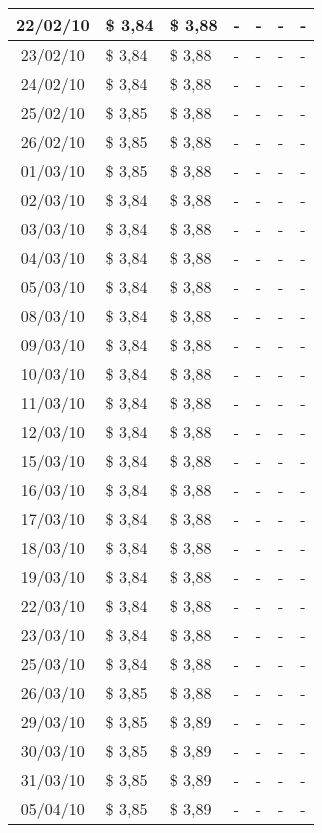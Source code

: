 \begin{center}
\begin{longtable}{|c|p{1.5cm}|p{1.5cm}|p{1.5cm}|p{1.5cm}|p{1.5cm}|p{1.5cm}|}
22/02/10 & \$ 3,84 & \$ 3,88 & - & - & - & - \\ \hline
23/02/10 & \$ 3,84 & \$ 3,88 & - & - & - & - \\ \hline
24/02/10 & \$ 3,84 & \$ 3,88 & - & - & - & - \\ \hline
25/02/10 & \$ 3,85 & \$ 3,88 & - & - & - & - \\ \hline
26/02/10 & \$ 3,85 & \$ 3,88 & - & - & - & - \\ \hline
01/03/10 & \$ 3,85 & \$ 3,88 & - & - & - & - \\ \hline
02/03/10 & \$ 3,84 & \$ 3,88 & - & - & - & - \\ \hline
03/03/10 & \$ 3,84 & \$ 3,88 & - & - & - & - \\ \hline
04/03/10 & \$ 3,84 & \$ 3,88 & - & - & - & - \\ \hline
05/03/10 & \$ 3,84 & \$ 3,88 & - & - & - & - \\ \hline
08/03/10 & \$ 3,84 & \$ 3,88 & - & - & - & - \\ \hline
09/03/10 & \$ 3,84 & \$ 3,88 & - & - & - & - \\ \hline
10/03/10 & \$ 3,84 & \$ 3,88 & - & - & - & - \\ \hline
11/03/10 & \$ 3,84 & \$ 3,88 & - & - & - & - \\ \hline
12/03/10 & \$ 3,84 & \$ 3,88 & - & - & - & - \\ \hline
15/03/10 & \$ 3,84 & \$ 3,88 & - & - & - & - \\ \hline
16/03/10 & \$ 3,84 & \$ 3,88 & - & - & - & - \\ \hline
17/03/10 & \$ 3,84 & \$ 3,88 & - & - & - & - \\ \hline
18/03/10 & \$ 3,84 & \$ 3,88 & - & - & - & - \\ \hline
19/03/10 & \$ 3,84 & \$ 3,88 & - & - & - & - \\ \hline
22/03/10 & \$ 3,84 & \$ 3,88 & - & - & - & - \\ \hline
23/03/10 & \$ 3,84 & \$ 3,88 & - & - & - & - \\ \hline
25/03/10 & \$ 3,84 & \$ 3,88 & - & - & - & - \\ \hline
26/03/10 & \$ 3,85 & \$ 3,88 & - & - & - & - \\ \hline
29/03/10 & \$ 3,85 & \$ 3,89 & - & - & - & - \\ \hline
30/03/10 & \$ 3,85 & \$ 3,89 & - & - & - & - \\ \hline
31/03/10 & \$ 3,85 & \$ 3,89 & - & - & - & - \\ \hline
05/04/10 & \$ 3,85 & \$ 3,89 & - & - & - & - \\ \hline

\end{longtable}
\end{center}
